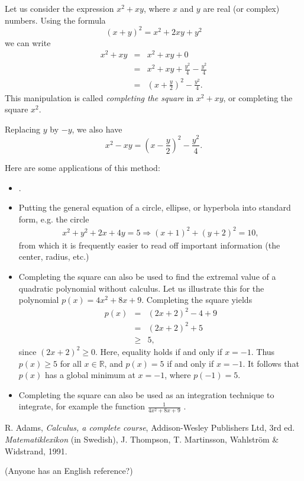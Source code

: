 \documentclass[12pt]{article}
\newcommand{\sR}[0]{\mathbb{R}}
\begin{document}
 Let us consider the expression $x^2+xy$, where
 $x$ and $y$ are real (or complex) numbers.
 Using the formula
 $$(x+y)^2 = x^2+2xy +y^2$$
 we can write
 \begin{eqnarray*}
 x^2+xy &=& x^2+xy+ 0\\
 &=& x^2+xy+ \frac{y^2}{4}-\frac{y^2}{4}\\
 &=& \left(x+\frac{y}{2}\right)^2-\frac{y^2}{4}.
 \end{eqnarray*}
 This manipulation is called \emph{completing the square} \cite{adams} in
 $x^2+xy$, or completing the square $x^2$.
 
Replacing $y$ by $-y$, we also have
 $$x^2-xy = \left(x-\frac{y}{2}\right)^2-\frac{y^2}{4}.$$

Here are some applications of this method:
\begin{itemize}
\item 
 .
\item Putting the general equation of a circle, ellipse, or hyperbola into standard form, e.g. the circle 
\begin{align*}
x^2+y^2+2x+4y=5\Rightarrow (x+1)^2 + (y+2)^2= 10,
\end{align*}
from which it is frequently easier to read off important information (the center, radius, etc.)
\item Completing the square can also be used to find the extremal value
of a quadratic polynomial \cite{thompson} without calculus. 
Let us illustrate this for the polynomial $p(x)=4x^2+8x+9$. 
Completing the square yields
\begin{eqnarray*}
p(x)   &=& (2x+2)^2-4 +9 \\
 &=& (2x+2)^2+5 \\
 &\ge & 5,
\end{eqnarray*}
since $(2x+2)^2\ge 0$. Here, equality holds if and 
only if $x=-1$.
Thus $p(x)\ge 5$ for all $x\in \sR$, and $p(x)=5$ if and only if
$x=-1$. 
It follows that $p(x)$ has a global minimum at $x=-1$, where $p(-1)=5$.
\item Completing the square can also be used as an integration technique
to integrate, for example the function $\displaystyle \frac{1}{4x^2+8x+9}$ \cite{adams}.
\end{itemize}


\begin{thebibliography}{9}
 R. Adams, \emph{Calculus, a complete course}, 
	Addison-Wesley Publishers Ltd, 3rd ed. 
        \emph{Matematiklexikon} (in Swedish), 
 J. Thompson, T. Martinsson, Wahlstr\"om \& Widstrand, 1991.        
\end{thebibliography}

(Anyone has an English reference?)
\end{document}
